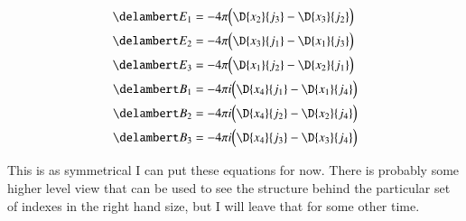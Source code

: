\documentclass{article}      %
\begin{document}
\begin{align*}
\delambert E_1 &= -4\pi \Bigl(\D{x_2}{j_3} - \D{x_3}{j_2} \Bigr) \\
\delambert E_2 &= -4\pi \Bigl(\D{x_3}{j_1} - \D{x_1}{j_3} \Bigr) \\
\delambert E_3 &= -4\pi \Bigl(\D{x_1}{j_2} - \D{x_2}{j_1} \Bigr) \\
\delambert B_1 &= -4\pi i \Bigl(\D{x_4}{j_1} - \D{x_1}{j_4} \Bigr)\\
\delambert B_2 &= -4\pi i \Bigl(\D{x_4}{j_2} - \D{x_2}{j_4} \Bigr)\\
\delambert B_3 &= -4\pi i \Bigl(\D{x_4}{j_3} - \D{x_3}{j_4} \Bigr)
\end{align*}

This is as symmetrical I can put these equations for now.  There is probably some higher level 
view that can be used to see the structure behind the particular set of indexes in the right 
hand size, but I will leave that for some other time.
\end{document}
